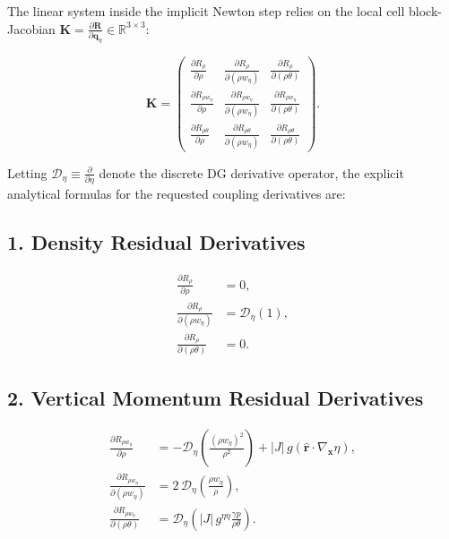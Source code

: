 \documentclass[11pt,a4paper]{article}
\begin{document}
The linear system inside the implicit Newton step relies on the local cell block-Jacobian $\mathbf{K} = \frac{\partial \mathbf{R}}{\partial \boldsymbol{q}_\eta} \in \mathbb{R}^{3 \times 3}$:

\begin{equation}
\mathbf{K} = \begin{pmatrix}
\frac{\partial R_\rho}{\partial \rho} & \frac{\partial R_\rho}{\partial (\rho w_\eta)} & \frac{\partial R_\rho}{\partial (\rho \theta)} \\[8pt]
\frac{\partial R_{\rho w_\eta}}{\partial \rho} & \frac{\partial R_{\rho w_\eta}}{\partial (\rho w_\eta)} & \frac{\partial R_{\rho w_\eta}}{\partial (\rho \theta)} \\[8pt]
\frac{\partial R_{\rho \theta}}{\partial \rho} & \frac{\partial R_{\rho \theta}}{\partial (\rho w_\eta)} & \frac{\partial R_{\rho \theta}}{\partial (\rho \theta)}
\end{pmatrix}.
\end{equation}

Letting $\mathcal{D}_\eta \equiv \frac{\partial}{\partial \eta}$ denote the discrete DG derivative operator, the explicit analytical formulas for the requested coupling derivatives are:

\subsection{1. Density Residual Derivatives}
\begin{align}
\frac{\partial R_\rho}{\partial \rho} &= 0, \\[6pt]
\frac{\partial R_\rho}{\partial (\rho w_\eta)} &= \mathcal{D}_\eta (1), \\[6pt]
\frac{\partial R_\rho}{\partial (\rho \theta)} &= 0.
\end{align}

\subsection{2. Vertical Momentum Residual Derivatives}
\begin{align}
\frac{\partial R_{\rho w_\eta}}{\partial \rho} &= -\mathcal{D}_\eta \left( \frac{(\rho w_\eta)^2}{\rho^2} \right) + |J| \, g \left( \hat{\boldsymbol{r}} \cdot \nabla_{\boldsymbol{x}} \eta \right), \\[6pt]
\frac{\partial R_{\rho w_\eta}}{\partial (\rho w_\eta)} &= 2 \, \mathcal{D}_\eta \left( \frac{\rho w_\eta}{\rho} \right), \\[6pt]
\frac{\partial R_{\rho w_\eta}}{\partial (\rho \theta)} &= \mathcal{D}_\eta \left( |J| \, g^{\eta\eta} \frac{\gamma p}{\rho\theta} \right).
\end{align}
\end{document}
